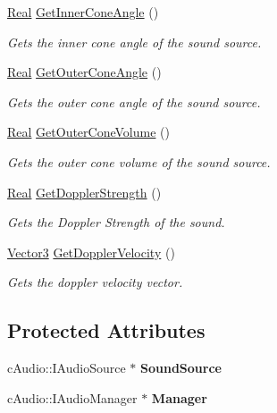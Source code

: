 \begin{DoxyCompactItemize}
\hyperlink{namespacephys_af7eb897198d265b8e868f45240230d5f}{Real} \hyperlink{classphys_1_1Sound_a5e39752133cd5d8d160455bbbcb360fd}{GetInnerConeAngle} ()
\begin{DoxyCompactList}\small\item\em Gets the inner cone angle of the sound source. \item\end{DoxyCompactList}\item 
\hyperlink{namespacephys_af7eb897198d265b8e868f45240230d5f}{Real} \hyperlink{classphys_1_1Sound_ad39ca4504655a777283fd2e238b729d1}{GetOuterConeAngle} ()
\begin{DoxyCompactList}\small\item\em Gets the outer cone angle of the sound source. \item\end{DoxyCompactList}\item 
\hyperlink{namespacephys_af7eb897198d265b8e868f45240230d5f}{Real} \hyperlink{classphys_1_1Sound_a2607037d0c40d32f402d0ebb98586a00}{GetOuterConeVolume} ()
\begin{DoxyCompactList}\small\item\em Gets the outer cone volume of the sound source. \item\end{DoxyCompactList}\item 
\hyperlink{namespacephys_af7eb897198d265b8e868f45240230d5f}{Real} \hyperlink{classphys_1_1Sound_a894e1390d76c6a6e79404569afeaf168}{GetDopplerStrength} ()
\begin{DoxyCompactList}\small\item\em Gets the Doppler Strength of the sound. \item\end{DoxyCompactList}\item 
\hyperlink{classphys_1_1Vector3}{Vector3} \hyperlink{classphys_1_1Sound_a9d4e845004b59ba5bdc066f7f12ff7d7}{GetDopplerVelocity} ()
\begin{DoxyCompactList}\small\item\em Gets the doppler velocity vector. \item\end{DoxyCompactList}\end{DoxyCompactItemize}
\subsection*{Protected Attributes}
\begin{DoxyCompactItemize}
\item 
\hypertarget{classphys_1_1Sound_a7cd63202ea3dbc96c6f466a60b89b0fe}{
cAudio::IAudioSource $\ast$ {\bfseries SoundSource}}
\label{dc/d2f/classphys_1_1Sound_a7cd63202ea3dbc96c6f466a60b89b0fe}

\item 
\hypertarget{classphys_1_1Sound_a84b31e91bd1363ba430a51f579a07e0b}{
cAudio::IAudioManager $\ast$ {\bfseries Manager}}
\label{dc/d2f/classphys_1_1Sound_a84b31e91bd1363ba430a51f579a07e0b}

\end{DoxyCompactItemize}
